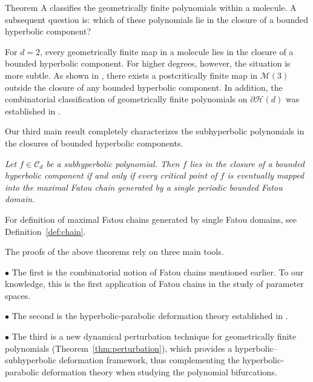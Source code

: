 \documentclass[a4paper,reqno,times, 11pt]{amsart}
\theoremstyle{remark}
\theoremstyle{plain}
\numberwithin{equation}{section}
\def\MMMM{{\cal M}}
\def\MMMM{\mathscr M}
\def\HHHH{\mathscr H}
\def\CCCC{\mathscr C}
\def\cal{\mathcal}
\begin{document}
	Theorem A classifies the geometrically finite polynomials within a molecule. A  subsequent question is: which of these polynomials lie in the closure of a bounded hyperbolic component?
	
	
	For $d=2$, every geometrically finite map in a molecule
	lies in the closure of a bounded hyperbolic component. For higher degrees,  however, the situation is more subtle.
	As shown in \cite[Section 3.2]{LP},  there exists a postcritically finite map in $\MMMM(3)$
	outside the closure of any bounded hyperbolic component.
	In addition, the combinatorial classification of geometrically finite polynomials on $\partial\HHHH(d)$ was established in \cite{Luo}.\vspace{2pt}
	
	Our third main result completely characterizes the subhyperbolic polynomials in the closures of bounded hyperbolic components.\vspace{8pt}
	
	\emph{Let $f\in\CCCC_d$ be a subhyperbolic polynomial. Then $f$ lies in the closure of a bounded hyperbolic component if and only if every critical point of $f$ is eventually mapped into the maximal Fatou chain generated by a single periodic bounded Fatou domain.
	}\vspace{8pt}
	
	For  definition of maximal Fatou chains generated by single Fatou domains, see Definition~\ref{def:chain}.
	\vspace{3pt}
	
	
	
	The proofs of the above theorems rely on three main tools.\vspace{3pt}
	
	$\bullet$ The first is the combinatorial notion of Fatou chains mentioned earlier. To our knowledge, this is the first application of Fatou chains in the study of parameter spaces.\vspace{3pt}
	
	
	$\bullet$ The second  is the hyperbolic-parabolic deformation theory established in \cite{CT2}. \vspace{3pt}
	
	$\bullet$ The third  is a new dynamical perturbation technique for geometrically finite polynomials (Theorem~\ref{thm:perturbation}), which provides a hyperbolic–subhyperbolic deformation framework, thus complementing the hyperbolic-parabolic deformation theory when studying the polynomial bifurcations.
	\vspace{3pt}
	
\end{document}
